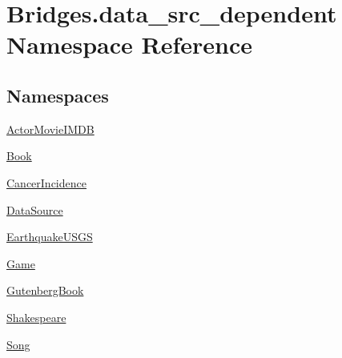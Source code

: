 \hypertarget{namespace_bridges_1_1data__src__dependent}{}\section{Bridges.\+data\+\_\+src\+\_\+dependent Namespace Reference}
\label{namespace_bridges_1_1data__src__dependent}
\subsection*{Namespaces}
\begin{DoxyCompactItemize}
\item 
 \hyperlink{namespace_bridges_1_1data__src__dependent_1_1_actor_movie_i_m_d_b}{Actor\+Movie\+I\+M\+D\+B}
\item 
 \hyperlink{namespace_bridges_1_1data__src__dependent_1_1_book}{Book}
\item 
 \hyperlink{namespace_bridges_1_1data__src__dependent_1_1_cancer_incidence}{Cancer\+Incidence}
\item 
 \hyperlink{namespace_bridges_1_1data__src__dependent_1_1_data_source}{Data\+Source}
\item 
 \hyperlink{namespace_bridges_1_1data__src__dependent_1_1_earthquake_u_s_g_s}{Earthquake\+U\+S\+G\+S}
\item 
 \hyperlink{namespace_bridges_1_1data__src__dependent_1_1_game}{Game}
\item 
 \hyperlink{namespace_bridges_1_1data__src__dependent_1_1_gutenberg_book}{Gutenberg\+Book}
\item 
 \hyperlink{namespace_bridges_1_1data__src__dependent_1_1_shakespeare}{Shakespeare}
\item 
 \hyperlink{namespace_bridges_1_1data__src__dependent_1_1_song}{Song}
\end{DoxyCompactItemize}
